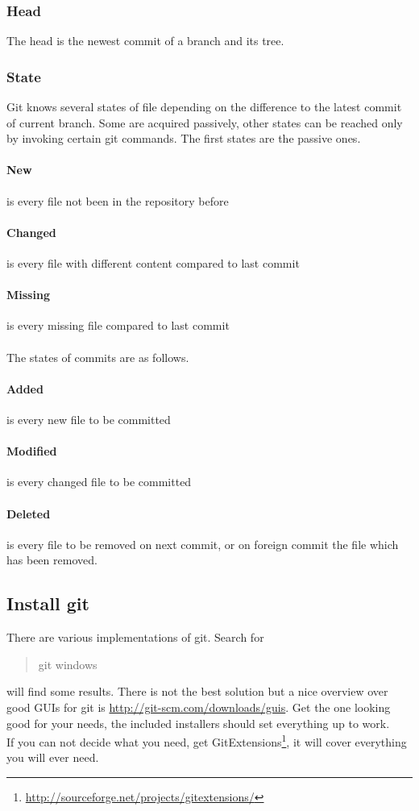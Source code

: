 \documentclass[10pt,a4paper,oneside]{article}
\begin{document}
\subsubsection{Head}
The head is the newest commit of a branch and its tree.

\subsubsection{State}
Git knows several states of file depending on the difference to the latest commit of current branch. Some are acquired passively, other states can be reached only by invoking certain git commands. The first states are the passive ones.
\paragraph{New} is every file not been in the repository before
\paragraph{Changed} is every file with different content compared to last commit
\paragraph{Missing} is every missing file compared to last commit \\
\\
The states of commits are as follows.
\paragraph{Added} is every new file to be committed
\paragraph{Modified} is every changed file to be committed
\paragraph{Deleted} is every file to be removed on next  commit, or on foreign commit the file which has been removed.

\subsection{Install git}
\label{gitInstal}
There are various implementations of git. Search for \begin{quote} git windows \end{quote} will find some results. There is not the best solution but a nice overview over good GUIs for git is \url{http://git-scm.com/downloads/guis}. Get the one looking good for your needs, the included installers should set everything up to work. \\
If you can not decide what you need, get GitExtensions\footnote{\url{http://sourceforge.net/projects/gitextensions/}},  it will cover everything you will ever need.
\end{document}
